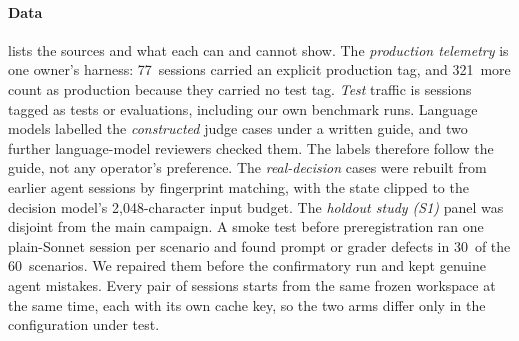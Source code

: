 \documentclass[11pt,letterpaper]{article}
\newcommand{\ObProdDefault}{321}
\newcommand{\ObProdTagged}{77}
\newcommand{\SmokeFixed}{30}
\newcommand{\SmokeN}{60}
\newcommand{\TrStateBudget}{2{,}048}
\begin{document}
\paragraph{Data}  lists the sources and what each can and cannot show. The \emph{production
telemetry} is one owner's harness: \ObProdTagged\ sessions carried an explicit production tag, and \ObProdDefault\ more
count as production because they carried no test tag. \emph{Test} traffic is sessions tagged as tests or evaluations,
including our own benchmark runs. Language models labelled the \emph{constructed} judge cases under a written guide, and two further language-model
reviewers checked them. The labels therefore follow the guide, not any operator's preference. The \emph{real-decision} cases were rebuilt from earlier agent sessions by fingerprint matching,
with the state clipped to the decision model's \TrStateBudget-character input budget. The \emph{holdout study (S1)}
panel was disjoint from the main campaign. A smoke test before preregistration ran one plain-Sonnet session per
scenario and found prompt or grader defects in \SmokeFixed\ of the \SmokeN\ scenarios. We repaired them before the
confirmatory run and kept genuine agent mistakes. Every pair of sessions starts from the same frozen workspace at the
same time, each with its own cache key, so the two arms differ only in the configuration under test.
\end{document}
